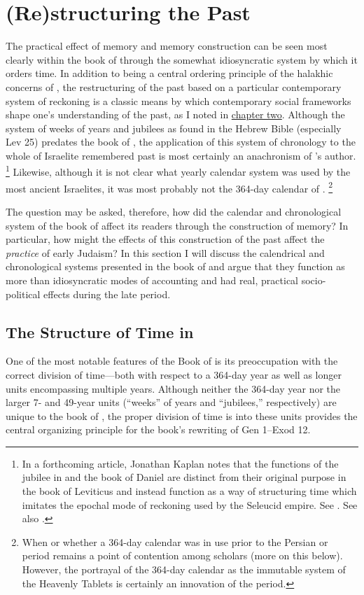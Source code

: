 \section{(Re)structuring the Past}
The practical effect of memory and memory construction can be seen most clearly within the book of \jub through the somewhat idiosyncratic system by which it orders time. In addition to being a central ordering principle of the halakhic concerns of \jub, the restructuring of the past based on a particular contemporary system of reckoning is a classic means by which contemporary social frameworks shape one's understanding of the past, as I noted in \hyperref[chap:memory]{chapter two}. Although the system of weeks of years and jubilees as found in the Hebrew Bible (especially Lev 25) predates the book of \jub, the application of this system of chronology to the whole of Israelite remembered past is most certainly an anachronism of \jub's author.%
    \footnote{%
        In a forthcoming article, Jonathan Kaplan notes that the functions of the jubilee in \jub and the book of Daniel are distinct from their original purpose in the book of Leviticus and instead function as a way of structuring time which imitates the epochal mode of reckoning used by the Seleucid empire. See 
        \cite{kaplan_jaj2019}. See also 
        \cite[137--186]{kosmin2018}.}
Likewise, although it is not clear what yearly calendar system was used by the most ancient Israelites, it was most probably not the 364-day calendar of \jub.%
    \footnote{%
        When or whether a 364-day calendar was in use prior to the Persian or \secondtemple period remains a point of contention among scholars (more on this below). However, the portrayal of the 364-day calendar as the immutable system of the Heavenly Tablets is certainly an innovation of the \secondtemple period.}

The question may be asked, therefore, how did the calendar and chronological system of the book of \jub affect its readers through the construction of memory? In particular, how might the effects of this construction of the past affect the \emph{practice} of early Judaism? In this section I will discuss the calendrical and chronological systems presented in the book of \jub and argue that they function as more than idiosyncratic modes of accounting and had real, practical socio-political effects during the late \secondtemple period.

\subsection{The Structure of Time in \jub}
One of the most notable features of the Book of \jub is its preoccupation with the correct division of time---both with respect to a 364-day year as well as longer units encompassing multiple years. Although neither the 364-day year nor the larger 7- and 49-year units (``weeks'' of years and ``jubilees,'' respectively) are unique to the book of \jub, the proper division of time is into these units provides the central organizing principle for the book's rewriting of Gen 1--Exod 12.

